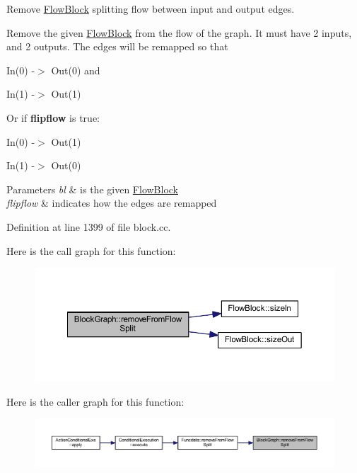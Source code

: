Remove \mbox{\hyperlink{class_flow_block}{Flow\+Block}} splitting flow between input and output edges. 

Remove the given \mbox{\hyperlink{class_flow_block}{Flow\+Block}} from the flow of the graph. It must have 2 inputs, and 2 outputs. The edges will be remapped so that
\begin{DoxyItemize}
\item In(0) -\/$>$ Out(0) and
\item In(1) -\/$>$ Out(1)
\end{DoxyItemize}

Or if {\bfseries{flipflow}} is true\+:
\begin{DoxyItemize}
\item In(0) -\/$>$ Out(1)
\item In(1) -\/$>$ Out(0) 
\begin{DoxyParams}{Parameters}
{\em bl} & is the given \mbox{\hyperlink{class_flow_block}{Flow\+Block}} \\
\hline
{\em flipflow} & indicates how the edges are remapped \\
\hline
\end{DoxyParams}

\end{DoxyItemize}

Definition at line 1399 of file block.\+cc.

Here is the call graph for this function\+:
\nopagebreak
\begin{figure}[H]
\begin{center}
\leavevmode
\includegraphics[width=350pt]{class_block_graph_a8c6e3329fe131f587a472413dfd60fcd_cgraph}
\end{center}
\end{figure}
Here is the caller graph for this function\+:
\nopagebreak
\begin{figure}[H]
\begin{center}
\leavevmode
\includegraphics[width=350pt]{class_block_graph_a8c6e3329fe131f587a472413dfd60fcd_icgraph}
\end{center}
\end{figure}
\mbox{\label{class_block_graph_a90d67a53a21174345f5f376c75ca6067}} 
